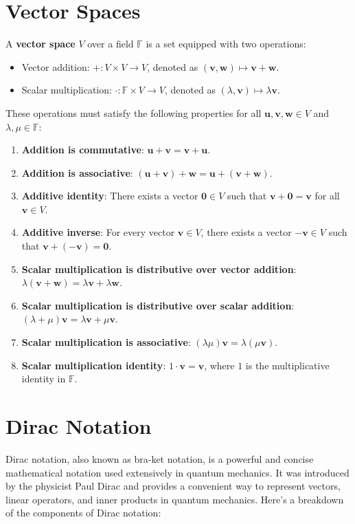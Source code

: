 \section{Vector Spaces}

A \textbf{vector space} $V$ over a field $\mathbb{F}$ is a set equipped with two operations:

\begin{itemize}
    \item Vector addition: $+: V \times V \rightarrow V$, denoted as $(\mathbf{v}, \mathbf{w}) \mapsto \mathbf{v} + \mathbf{w}$.
    \item Scalar multiplication: $\cdot: \mathbb{F} \times V \rightarrow V$, denoted as $(\lambda, \mathbf{v}) \mapsto \lambda \mathbf{v}$.
\end{itemize}
These operations must satisfy the following properties for all $\mathbf{u}, \mathbf{v}, \mathbf{w} \in V$ and $\lambda, \mu \in \mathbb{F}$:

\begin{enumerate}
    \item \textbf{Addition is commutative}: $\mathbf{u} + \mathbf{v} = \mathbf{v} + \mathbf{u}$.
    \item \textbf{Addition is associative}: $(\mathbf{u} + \mathbf{v}) + \mathbf{w} = \mathbf{u} + (\mathbf{v} + \mathbf{w})$.
    \item \textbf{Additive identity}: There exists a vector $\mathbf{0} \in V$ such that $\mathbf{v} + \mathbf{0} = \mathbf{v}$ for all $\mathbf{v} \in V$.
    \item \textbf{Additive inverse}: For every vector $\mathbf{v} \in V$, there exists a vector $-\mathbf{v} \in V$ such that $\mathbf{v} + (-\mathbf{v}) = \mathbf{0}$.
    \item \textbf{Scalar multiplication is distributive over vector addition}: $\lambda (\mathbf{v} + \mathbf{w}) = \lambda \mathbf{v} + \lambda \mathbf{w}$.
    \item \textbf{Scalar multiplication is distributive over scalar addition}: $(\lambda + \mu) \mathbf{v} = \lambda \mathbf{v} + \mu \mathbf{v}$.
    \item \textbf{Scalar multiplication is associative}: $(\lambda \mu) \mathbf{v} = \lambda (\mu \mathbf{v})$.
    \item \textbf{Scalar multiplication identity}: $1 \cdot \mathbf{v} = \mathbf{v}$, where $1$ is the multiplicative identity in $\mathbb{F}$.
\end{enumerate}


\section{Dirac Notation}
Dirac notation, also known as bra-ket notation, is a powerful and concise mathematical notation used extensively in quantum mechanics.
It was introduced by the physicist Paul Dirac and provides a convenient way to represent vectors, linear operators, and inner products in quantum mechanics.
Here's a breakdown of the components of Dirac notation:

